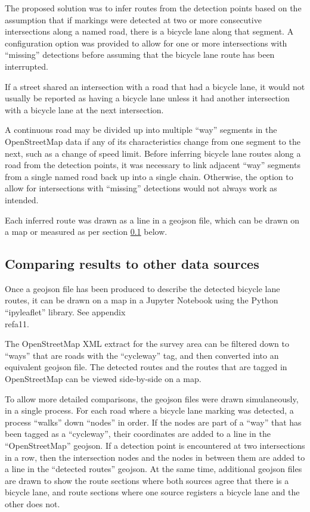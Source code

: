 \documentclass[11pt,twoside]{report}
\begin{document}
The proposed solution was to infer routes from the detection points based on the assumption that if markings were detected at two or more consecutive intersections along a named road, there is a bicycle lane along that segment.  A configuration option was provided to allow for one or more intersections with ``missing'' detections before assuming that the bicycle lane route has been interrupted.

If a street shared an intersection with a road that had a bicycle lane, it would not usually be reported as having a bicycle lane unless it had another intersection with a bicycle lane at the next intersection.

A continuous road may be divided up into multiple ``way'' segments in the OpenStreetMap data if any of its characteristics change from one segment to the next, such as a change of speed limit.  Before inferring bicycle lane routes along a road from the detection points, it was necessary to link adjacent ``way'' segments from a single named road back up into a single chain.  Otherwise, the option to allow for intersections with ``missing'' detections would not always work as intended.

Each inferred route was drawn as a line in a geojson file, which can be drawn on a map or measured as per section \ref{s:rq2d} below.


\subsection{Comparing results to other data sources}
\label{s:rq2d}

Once a geojson file has been produced to describe the detected bicycle lane routes, it can be drawn on a map in a Jupyter Notebook using the Python ``ipyleaflet'' library.  See appendix \\ref{a11}.

The OpenStreetMap XML extract for the survey area can be filtered down to ``ways'' that are roads with the ``cycleway'' tag, and then converted into an equivalent geojson file.  The detected routes and the routes that are tagged in OpenStreetMap can be viewed side-by-side on a map.

To allow more detailed comparisons, the geojson files were drawn simulaneously, in a single process.  For each road where a bicycle lane marking was detected, a process ``walks'' down ``nodes'' in order.  If the nodes are part of a ``way'' that has been tagged as a ``cycleway'', their coordinates are added to a line in the ``OpenStreetMap'' geojson.  If a detection point is encountered at two intersections in a row, then the intersection nodes and the nodes in between them are added to a line in the ``detected routes'' geojson.  At the same time, additional geojson files are drawn to show the route sections where both sources agree that there is a bicycle lane, and route sections where one source registers a bicycle lane and the other does not.
\end{document}
